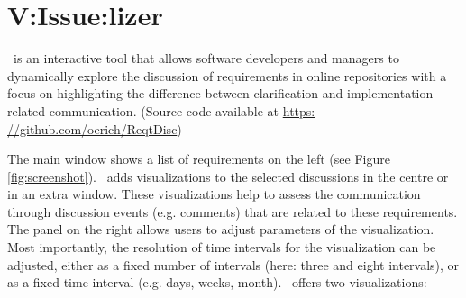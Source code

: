 \section{V:Issue:lizer}


\viss\  is an interactive tool that allows software developers and managers to dynamically explore the discussion of requirements  in online repositories with a focus on highlighting the difference between clarification and implementation related communication. (Source code available at \url{https: //github.com/oerich/ReqtDisc})


The main window shows a list of requirements on the  left  (see Figure \ref{fig:screenshot}).
\viss\ adds visualizations to the selected discussions in the centre or in an extra window. 
These visualizations help to assess the communication through discussion events (e.g. comments) that are related to these requirements.
The panel on the right allows users to adjust parameters of the visualization.
Most importantly, the resolution of time intervals for the visualization can be adjusted, either as a fixed number of intervals (here: three and eight intervals), or as a fixed time interval (e.g. days, weeks, month).
%
\viss\  offers  two visualizations: 

